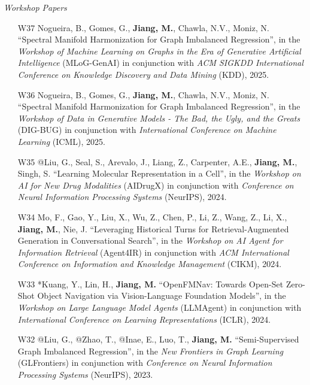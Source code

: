 \documentclass[10pt]{article}
\newenvironment{myindentpar}[1]%
{\begin{list}{}%
         {\setlength{\leftmargin}{#1}}%
         \item[]%
}
{\end{list}}
\newcounter{list}
\begin{document}
\begin{myindentpar}{0.00cm}
\begin{enumerate}[leftmargin=.5cm]
\end{enumerate}

\hspace{-0.25cm}\textit{Workshop Papers}

\begin{enumerate}[leftmargin=.5cm]

\item[W37] Nogueira, B., Gomes, G., \textbf{Jiang, M.}, Chawla, N.V., Moniz, N. ``Spectral Manifold Harmonization for Graph Imbalanced Regression'', in the \textit{Workshop of Machine Learning on Graphs in the Era of Generative Artificial Intelligence} (MLoG-GenAI) in conjunction with \textit{ACM SIGKDD International Conference on Knowledge Discovery and Data Mining} (KDD), 2025.

\item[W36] Nogueira, B., Gomes, G., \textbf{Jiang, M.}, Chawla, N.V., Moniz, N. ``Spectral Manifold Harmonization for Graph Imbalanced Regression'', in the \textit{Workshop of Data in Generative Models - The Bad, the Ugly, and the Greats} (DIG-BUG) in conjunction with \textit{International Conference on Machine Learning} (ICML), 2025.

\item[W35] @Liu, G., Seal, S., Arevalo, J., Liang, Z., Carpenter, A.E., \textbf{Jiang, M.}, Singh, S. ``Learning Molecular Representation in a Cell'', in the \textit{Workshop on AI for New Drug Modalities} (AIDrugX) in conjunction with \textit{Conference on Neural Information Processing Systems} (NeurIPS), 2024.
		
\item[W34] Mo, F., Gao, Y., Liu, X., Wu, Z., Chen, P., Li, Z., Wang, Z., Li, X., \textbf{Jiang, M.}, Nie, J. ``Leveraging Historical Turns for Retrieval-Augmented Generation in Conversational Search'', in the \textit{Workshop on AI Agent for Information Retrieval} (Agent4IR) in conjunction with \textit{ACM International Conference on Information and Knowledge Management} (CIKM), 2024.
		
\item[W33] *Kuang, Y., Lin, H., \textbf{Jiang, M.} ``OpenFMNav: Towards Open-Set Zero-Shot Object Navigation via Vision-Language Foundation Models'', in the \textit{Workshop on Large Language Model Agents} (LLMAgent) in conjunction with \textit{International Conference on Learning Representations} (ICLR), 2024.

\item[W32] @Liu, G., @Zhao, T., @Inae, E., Luo, T., \textbf{Jiang, M.} ``Semi-Supervised Graph Imbalanced Regression'', in the \textit{New Frontiers in Graph Learning} (GLFrontiers) in conjunction with \textit{Conference on Neural Information Processing Systems} (NeurIPS), 2023.


\end{enumerate}
\end{myindentpar}
\end{document}
